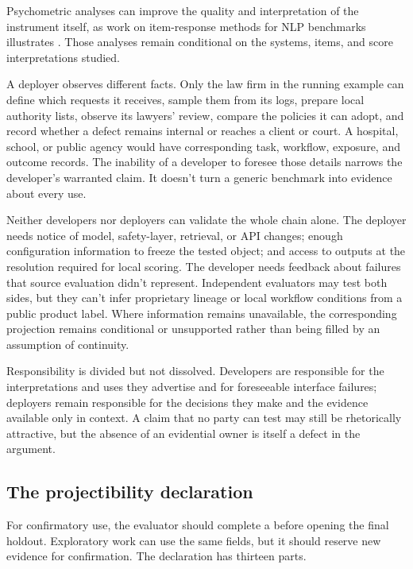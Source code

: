 \documentclass[12pt]{article}
\begin{document}
Psychometric analyses can improve the quality and interpretation of the instrument itself, as work on item-response methods for NLP benchmarks illustrates \citep{bachmannEtAl2024psychometrics}. Those analyses remain conditional on the systems, items, and score interpretations studied.

A deployer observes different facts. Only the law firm in the running example can define which requests it receives, sample them from its logs, prepare local authority lists, observe its lawyers' review, compare the policies it can adopt, and record whether a defect remains internal or reaches a client or court. A hospital, school, or public agency would have corresponding task, workflow, exposure, and outcome records. The inability of a developer to foresee those details narrows the developer's warranted claim. It doesn't turn a generic benchmark into evidence about every use.

Neither developers nor deployers can validate the whole chain alone. The deployer needs notice of model, safety-layer, retrieval, or API changes; enough configuration information to freeze the tested object; and access to outputs at the resolution required for local scoring. The developer needs feedback about failures that source evaluation didn't represent. Independent evaluators may test both sides, but they can't infer proprietary lineage or local workflow conditions from a public product label. Where information remains unavailable, the corresponding projection remains conditional or unsupported rather than being filled by an assumption of continuity.

Responsibility is divided but not dissolved. Developers are responsible for the interpretations and uses they advertise and for foreseeable interface failures; deployers remain responsible for the decisions they make and the evidence available only in context. A claim that no party can test may still be rhetorically attractive, but the absence of an evidential owner is itself a defect in the argument.

\subsection{The projectibility declaration}\label{ssec:declaration}

For confirmatory use, the evaluator should complete a  before opening the final holdout. Exploratory work can use the same fields, but it should reserve new evidence for confirmation. The declaration has thirteen parts.
\end{document}
